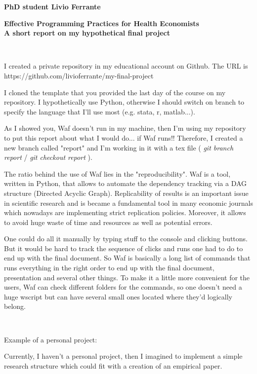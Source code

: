 \documentclass[11pt]{article}
\author{Livio Ferrante}
\title{}
\begin{document}
{\raggedright
\textbf{PhD student Livio Ferrante}
}

{\raggedright
\textbf{Effective Programming Practices for Health Economists\\
A short report on my {\small
hypothetical final project}}}\\
{\raggedright
I created a private repository in my educational account on Github. The URL is \\
 https://github.com/livioferrante/my-final-project
}

{\raggedright
I cloned the template that you provided the last day of the course on my repository. I hypothetically use Python, otherwise I should switch on branch to specify the language that I'll use most (e.g. stata, r, matlab...).
}

{\raggedright
As I showed you, Waf doesn't run in my machine, then I'm using my repository to put this report about what I would do... if Waf runs!! Therefore, I created a new branch called "report" and I'm working in it with a tex file ( \textit{git branch report}   /   \textit{git checkout report} ).
}

{\raggedright
The ratio behind the use of Waf lies in the "reproducibility". Waf is a tool, written in Python, that allows to automate the dependency tracking via a DAG structure (Directed Acyclic Graph). Replicability of results is an important issue in scientific research and is became a fundamental tool in many economic journals which nowadays are implementing strict replication policies. Moreover, it allows to avoid huge waste of time and resources as well as potential errors.
}

{\raggedright One could do all it manually by typing stuff to the console and clicking buttons. But it would be hard to track the sequence of clicks and runs one had to do to end up with the final document. So Waf is basically a long list of commands that runs everything in the right order to end up with the final document, presentation and several other things. To make it a little more convenient for the users, Waf can check different folders for the commands, so one doesn't need a huge wscript but can have several small ones located where they'd logically belong.}\\

{\raggedright
Example of a personal project:\\
}
{\raggedright
Currently, I haven't a personal project, then I imagined to implement a simple research structure which could fit with a creation of an empirical paper.
}
\end{document}
